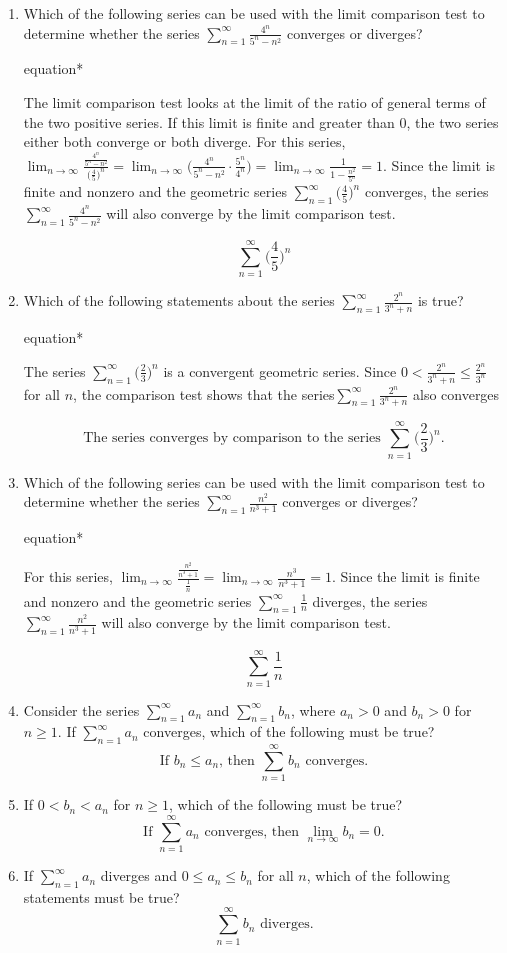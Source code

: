 \documentclass[12pt]{article}
\begin{document}
\begin{enumerate}
	\item Which of the following series can be used with the limit comparison test to determine whether the series $\sum_{n=1}^{\infty} \frac{4^n}{5^n-n^2}$ converges or diverges?
	\begin{empheq}[box=\tcbhighmath]{equation*}
		\parbox{6in}{The limit comparison test looks at the limit of the ratio of general terms of the two positive series. If this limit is finite and greater than $0$, the two series either both converge or both diverge. For this series, $\lim_{n\to\infty}\frac{\frac{4^n}{5^n-n^2}}{\big(\frac{4}{5}\big)^n} = \lim_{n\to\infty} \bigg(\frac{4^n}{5^n-n^2} \cdot \frac{5^n}{4^n}\bigg) = \lim_{n\to\infty} \frac{1}{1-\frac{n^2}{5^n}} = 1$. Since the limit is finite and nonzero and the geometric series $\sum_{n=1}^{\infty} \big(\frac{4}{5}\big)^n$ converges, the series $\sum_{n=1}^{\infty} \frac{4^n}{5^n-n^2}$ will also converge by the limit comparison test.}
	  \end{empheq}
	  $$\boxed{\sum_{n=1}^{\infty} \bigg(\frac{4}{5}\bigg)^n}$$
	\item Which of the following statements about the series $\sum_{n=1}^{\infty} \frac{2^n}{3^n+n}$ is true?
	\begin{empheq}[box=\tcbhighmath]{equation*}
		\parbox{6in}{The series $\sum_{n=1}^{\infty} \bigg(\frac{2}{3}\bigg)^n$ is a convergent geometric series. Since $0 < \frac{2^n}{3^n+n} \leq \frac{2^n}{3^n}$ for all $n$, the comparison test shows that the series$\sum_{n=1}^{\infty} \frac{2^n}{3^n+n}$ also converges}
	\end{empheq}
	$$\boxed{\text{The series converges by comparison to the series $\sum_{n=1}^{\infty} \bigg(\frac{2}{3}\bigg)^n$.}}$$
	\item Which of the following series can be used with the limit comparison test to determine whether the series $\sum_{n=1}^{\infty} \frac{n^2}{n^3+1}$ converges or diverges?
	\begin{empheq}[box=\tcbhighmath]{equation*}
		\parbox{6in}{For this series, $\lim_{n\to\infty} \frac{\frac{n^2}{n^3+1}}{\frac{1}{n}} = \lim_{n\to\infty} \frac{n^3}{n^3+1} = 1$. Since the limit is finite and nonzero and the geometric series $\sum_{n=1}^{\infty} \frac{1}{n}$ diverges, the series $\sum_{n=1}^{\infty} \frac{n^2}{n^3+1}$ will also converge by the limit comparison test.}
	  \end{empheq}
	$$\boxed{\sum_{n=1}^{\infty}\frac{1}{n}}$$
	\item Consider the series $\sum_{n=1}^{\infty} a_n$ and $\sum_{n=1}^{\infty} b_n$, where $a_n>0$ and $b_n>0$ for $n\geq1$. If $\sum_{n=1}^{\infty} a_n$ converges, which of the following must be true?
	$$\boxed{\text{If $b_n \leq a_n$, then $\sum_{n=1}^{\infty} b_n$ converges.}}$$
	\item If $0<b_n<a_n$ for $n\geq 1$, which of the following must be true?
	$$\boxed{\text{If $\sum_{n=1}^{\infty}a_n$ converges, then $\lim_{n\to \infty} b_n = 0$.}}$$
	\item If $\sum_{n=1}^{\infty} a_n$ diverges and $0 \leq a_n \leq b_n$ for all $n$, which of the following statements must be true?
	$$\boxed{\sum_{n=1}^{\infty} b_n \text{ diverges.}}$$
\end{enumerate}
\end{document}
